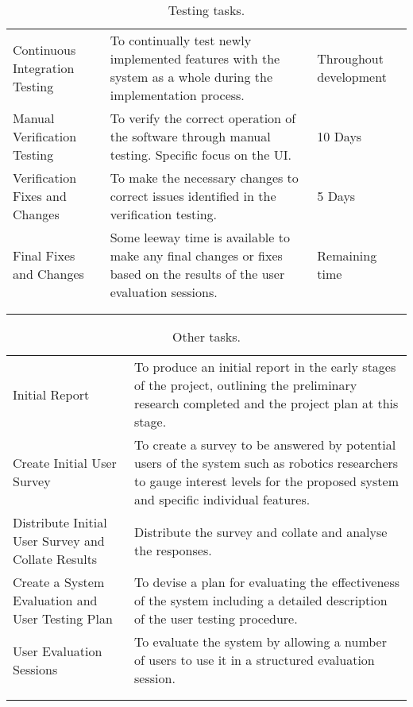 \begin{longtable}{ >{\raggedright}p{5cm}>{\raggedright}p{6cm}p{3cm} }
	\label{tab:DevTasks}
\end{longtable}

\begin{longtable}{ >{\raggedright}p{5cm}>{\raggedright}p{6cm}p{3cm} }
	\caption{Testing tasks.}\\
	\toprule
	\tabhead{Task} & \tabhead{Objective} & \tabhead{Approximate Time} \\
	\midrule
	
Continuous Integration Testing & To continually test newly implemented features with the system as a whole during the implementation process. & Throughout development
\\
Manual Verification Testing & To verify the correct operation of the software through manual testing. Specific focus on the UI. & 10 Days
\\
Verification Fixes and Changes & To make the necessary changes to correct issues identified in the verification testing. & 5 Days
\\ 
Final Fixes and Changes & Some leeway time is available to make any final changes or fixes based on the results of the user evaluation sessions. & Remaining time 
\\ 
	\bottomrule\\
	
	\label{tab:TestingTasks}
\end{longtable}

\begin{longtable}{ p{5cm}p{9cm} }
	\caption{Other tasks.}\\
	\toprule
	\tabhead{Task} & \tabhead{Objective} \\
	\midrule
	
Initial Report & To produce an initial report in the early stages of the project, outlining the preliminary research completed and the project plan at this stage.
\\
Create Initial User Survey & To create a survey to be answered by potential users of the system such as robotics researchers to gauge interest levels for the proposed system and specific individual features.
\\
Distribute Initial User Survey and Collate Results & Distribute the survey and collate and analyse the responses.
\\
Create a System Evaluation and User Testing Plan & To devise a plan for evaluating the effectiveness of the system including a detailed description of the user testing procedure.
\\
User Evaluation Sessions & To evaluate the system by allowing a number of users to use it in a structured evaluation session.
\\
	\bottomrule\\
	
	\label{tab:OtherTasks}
\end{longtable}



